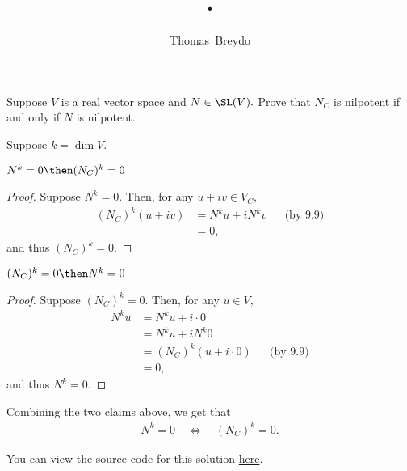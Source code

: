 \documentclass{amsart}
\title{\pagenum.\probnum}
\author{Thomas\ Breydo}
\newcommand{\pagenum}{285}
\newcommand{\probnum}{7}
\begin{document}
\maketitle

\begin{problem*}
Suppose $V$ is a real vector space and $N\in\SL(V).$ Prove that
$N_C$ is nilpotent if and only if $N$ is nilpotent.
\end{problem*}

\vspace{0.5in}

\newcommand{\dimv}{k}

Suppose $k=\dim V.$

\begin{claim*}
$N^{\dimv}=0 \then (N_C)^{\dimv}=0$
\end{claim*}
\begin{proof}
Suppose $N^{\dimv}=0.$ Then, for any $u+iv\in V_C,$
\begin{align*}
    (N_C)^\dimv(u+iv) &= N^\dimv u+iN^\dimv v && \text{(by 9.9)} \\
              &= 0,
\end{align*}
and thus $(N_C)^k=0.$
\end{proof}

\begin{claim*}
$(N_C)^{\dimv}=0 \then N^{\dimv}=0$
\end{claim*}
\begin{proof}
Suppose $(N_C)^\dimv=0.$ Then, for any $u\in V,$
\begin{align*}
    N^ku &= N^ku + i\cdot 0 \\
         &= N^ku + iN^k0 \\
         &= (N_C)^\dimv(u+i\cdot 0) && \text{(by 9.9)} \\
         &= 0,
\end{align*}
and thus $N^k=0.$
\end{proof}

Combining the two claims above, we get that
\begin{align*}
    N^k = 0 \quad\iff\quad (N_C)^k=0.
\end{align*}

\vspace{0.5in}

\begin{note*}
You can view the source code for this solution
\href{https://github.com/thomasbreydo/linalg/blob/main/\pagenum_\probnum_Thomas_Breydo.tex}
{here}.
\end{note*}
\end{document}
